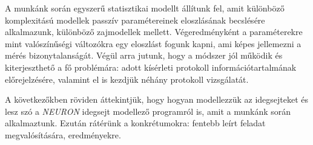 A munkánk során egyszerű statisztikai modellt állítunk fel, amit különböző komplexitású modellek passzív paramétereinek eloszlásának becslésére alkalmazunk, különböző zajmodellek mellett. Végeredményként a paraméterekre mint valószínűségi változókra egy eloszlást fogunk kapni, ami képes jellemezni a mérés bizonytalanságát. Végül arra jutunk, hogy a módszer jól működik és kiterjeszthető a fő problémára: adott kísérleti protokoll információtartalmának előrejelzésére, valamint el is kezdjük néhány protokoll vizsgálatát.


A következőkben röviden áttekintjük, hogy hogyan modellezzük az idegsejteket és lesz szó a \textit{NEURON} idegsejt modellező programról is, amit a munkánk során alkalmaztunk. Ezután rátérünk a konkrétumokra: fentebb leírt feladat megvalósítására, eredményekre.



